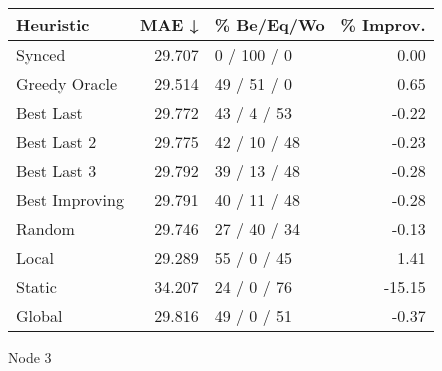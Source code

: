 \begin{tabular}{lrlr}
\toprule
\textbf{Heuristic} & \textbf{MAE ↓} & \textbf{\% Be/Eq/Wo} & \textbf{\% Improv.} \\
\midrule
            Synced &         29.707 &          0 / 100 / 0 &                0.00 \\
     Greedy Oracle &         29.514 &          49 / 51 / 0 &                0.65 \\
         Best Last &         29.772 &          43 / 4 / 53 &               -0.22 \\
       Best Last 2 &         29.775 &         42 / 10 / 48 &               -0.23 \\
       Best Last 3 &         29.792 &         39 / 13 / 48 &               -0.28 \\
    Best Improving &         29.791 &         40 / 11 / 48 &               -0.28 \\
            Random &         29.746 &         27 / 40 / 34 &               -0.13 \\
             Local &         29.289 &          55 / 0 / 45 &                1.41 \\
            Static &         34.207 &          24 / 0 / 76 &              -15.15 \\
            Global &         29.816 &          49 / 0 / 51 &               -0.37 \\
\bottomrule
\end{tabular}
\caption{Node 3}
\label{tab:non_lr01_le1_bs2_3}

